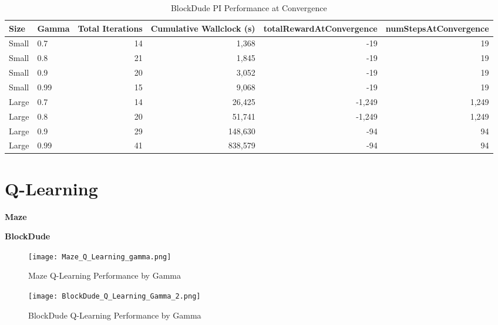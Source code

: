 \documentclass{article}
\begin{document}
\begin{table}
    \centering
    \caption{BlockDude PI Performance at Convergence}
    \begin{tabular}{llrrrr}
        \toprule
        Size & Gamma &  Total Iterations &  Cumulative Wallclock (s) &  totalRewardAtConvergence &  numStepsAtConvergence \\
        \midrule
        Small &         0.7 &    14 &              1,368 &                       -19 &                     19 \\
        Small &         0.8 &    21 &              1,845 &                       -19 &                     19 \\
        Small &         0.9 &    20 &              3,052 &                       -19 &                     19 \\
        Small &        0.99 &    15 &              9,068 &                       -19 &                     19 \\
        \midrule
        Large &         0.7 &    14 &             26,425 &                    -1,249 &                   1,249 \\
        Large &         0.8 &    20 &             51,741 &                    -1,249 &                   1,249 \\
        Large &         0.9 &    29 &            148,630 &                       -94 &                     94 \\
        Large &        0.99 &    41 &            838,579 &                       -94 &                     94 \\
        \bottomrule
        \end{tabular}
    \end{table}


\section{Q-Learning} \label{QL}

\textbf{Maze}

\textbf{BlockDude}

\begin{figure}
    \centering
    \begin{minipage}{0.5\textwidth}
        \centering
        \texttt{[image: Maze\_Q\_Learning\_gamma.png]}
        \caption{Maze Q-Learning Performance by Gamma}
        \label{fig:small-maze-pi}
    \end{minipage}\hfill
    \begin{minipage}{0.5\textwidth}
        \centering
        \texttt{[image: BlockDude\_Q\_Learning\_Gamma\_2.png]}
        \caption{BlockDude Q-Learning Performance by Gamma}
        \label{fig:large-maze-pi}
    \end{minipage}
\end{figure}
\end{document}
